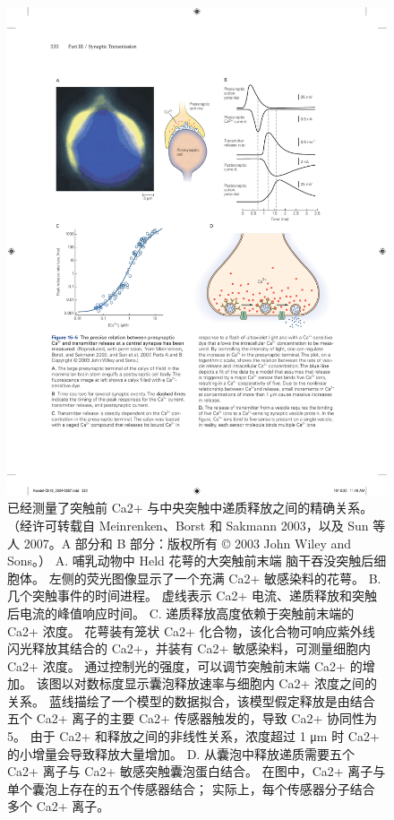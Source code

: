 \begin{figure}[htbp]
	\centering
	\includegraphics[width=0.9\linewidth]{chap15/fig_15_5}
	\caption{已经测量了突触前 Ca2+ 与中央突触中递质释放之间的精确关系。 （经许可转载自 Meinrenken、Borst 和 Sakmann 2003，以及 Sun 等人 2007。A 部分和 B 部分：版权所有 © 2003 John Wiley and Sons。） A. 哺乳动物中 Held 花萼的大突触前末端 脑干吞没突触后细胞体。 左侧的荧光图像显示了一个充满 Ca2+ 敏感染料的花萼。 B. 几个突触事件的时间进程。 虚线表示 Ca2+ 电流、递质释放和突触后电流的峰值响应时间。 C. 递质释放高度依赖于突触前末端的 Ca2+ 浓度。 花萼装有笼状 Ca2+ 化合物，该化合物可响应紫外线闪光释放其结合的 Ca2+，并装有 Ca2+ 敏感染料，可测量细胞内 Ca2+ 浓度。 通过控制光的强度，可以调节突触前末端 Ca2+ 的增加。 该图以对数标度显示囊泡释放速率与细胞内 Ca2+ 浓度之间的关系。 蓝线描绘了一个模型的数据拟合，该模型假定释放是由结合五个 Ca2+ 离子的主要 Ca2+ 传感器触发的，导致 Ca2+ 协同性为 5。 由于 Ca2+ 和释放之间的非线性关系，浓度超过 1 μm 时 Ca2+ 的小增量会导致释放大量增加。 D. 从囊泡中释放递质需要五个 Ca2+ 离子与 Ca2+ 敏感突触囊泡蛋白结合。 在图中，Ca2+ 离子与单个囊泡上存在的五个传感器结合； 实际上，每个传感器分子结合多个 Ca2+ 离子。}
	\label{fig:15_5}
\end{figure}

